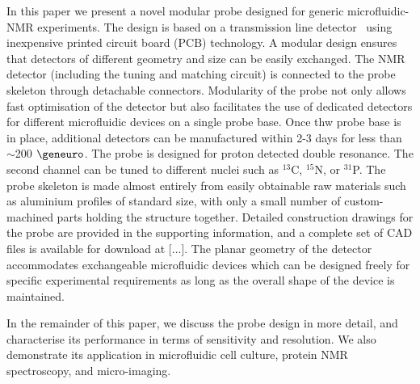 \documentclass[preprint,5p]{elsarticle}
\begin{document}
In this paper we present a novel modular probe designed for generic 
microfluidic-NMR experiments. The design is based on a transmission line 
detector~\cite{stripline_jan,gream_2016} using inexpensive 
printed circuit board (PCB) technology. A modular design ensures that detectors of 
different geometry and size can be easily exchanged. 
The NMR detector (including the tuning and matching circuit) is connected to the probe 
skeleton through detachable connectors. Modularity of the probe not only allows 
fast optimisation of the detector but also facilitates the use of dedicated detectors 
for different microfluidic devices on a single probe base. 
Once thw probe base is in place, additional detectors can be manufactured 
within 2-3 days for less than $\sim$200 $\geneuro$. 
The probe is designed for proton detected double resonance. 
The second channel can be tuned to different nuclei such as $^{13}$C, $^{15}$N, or 
$^{31}$P. The probe skeleton is made almost entirely from easily obtainable raw materials 
such as aluminium profiles of standard size, with only a small number of 
custom-machined parts holding the structure together. 
Detailed construction drawings for the probe are provided in the supporting 
information, and a complete set of CAD files is available for download at [...].
The planar geometry of the detector accommodates exchangeable microfluidic devices 
which can be designed freely for specific experimental requirements as long as the 
overall shape of the device is maintained. 

In the remainder of this paper, we discuss the probe design in more detail, 
and characterise its performance in terms of sensitivity and resolution. 
We also demonstrate its application in microfluidic cell culture, 
protein NMR spectroscopy, and micro-imaging. 
\end{document}
